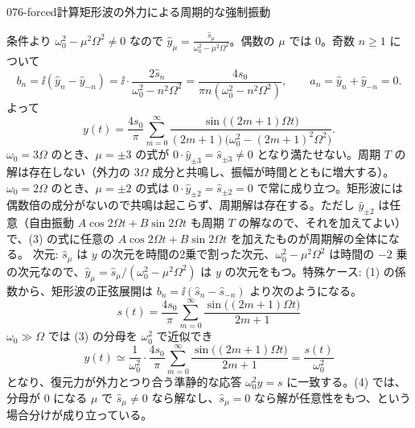 \documentclass[uplatex,dvipdfmx,a4paper,11pt]{jsarticle}
\begin{document}
\begin{mondai}{076-forced}{計算}{矩形波の外力による周期的な強制振動}
\begin{tadashii}
\[\]
 条件より $\omega_0^{2}-\mu^{2}\Omega^{2}\neq0$ なので $\hat{y}_{\mu}=\frac{\hat{s}_{\mu}}{\omega_0^{2}-\mu^{2}\Omega^{2}}$。偶数の $\mu$ では $0$。奇数 $n\ge1$ について
\[
b_n=\ii(\hat{y}_n-\hat{y}_{-n})=\ii\cdot\frac{2\hat{s}_n}{\omega_0^{2}-n^{2}\Omega^{2}}=\frac{4s_0}{\pi n(\omega_0^{2}-n^{2}\Omega^{2})},\qquad a_n=\hat{y}_n+\hat{y}_{-n}=0.
\]
よって
\[
y(t)=\frac{4s_0}{\pi}\sum_{m=0}^{\infty}\frac{\sin\bigl((2m+1)\Omega t\bigr)}{(2m+1)\bigl(\omega_0^{2}-(2m+1)^{2}\Omega^{2}\bigr)}.
\]
 $\omega_0=3\Omega$ のとき、$\mu=\pm3$ の式が $0\cdot\hat{y}_{\pm3}=\hat{s}_{\pm3}\neq0$ となり満たせない。周期 $T$ の解は存在しない（外力の $3\Omega$ 成分と共鳴し、振幅が時間とともに増大する）。
$\omega_0=2\Omega$ のとき、$\mu=\pm2$ の式は $0\cdot\hat{y}_{\pm2}=\hat{s}_{\pm2}=0$ で常に成り立つ。矩形波には偶数倍の成分がないので共鳴は起こらず、周期解は存在する。ただし $\hat{y}_{\pm2}$ は任意（自由振動 $A\cos2\Omega t+B\sin2\Omega t$ も周期 $T$ の解なので、それを加えてよい）で、(3) の式に任意の $A\cos2\Omega t+B\sin2\Omega t$ を加えたものが周期解の全体になる。
\kenzan 次元: $\hat{s}_{\mu}$ は $y$ の次元を時間の2乗で割った次元、$\omega_0^{2}-\mu^{2}\Omega^{2}$ は時間の $-2$ 乗の次元なので、$\hat{y}_{\mu}=\hat{s}_{\mu}/(\omega_0^{2}-\mu^{2}\Omega^{2})$ は $y$ の次元をもつ。特殊ケース: (1) の係数から、矩形波の正弦展開は $b_n=\ii(\hat{s}_n-\hat{s}_{-n})$ より次のようになる。
\[
s(t)=\frac{4s_0}{\pi}\sum_{m=0}^{\infty}\frac{\sin\bigl((2m+1)\Omega t\bigr)}{2m+1}
\]
$\omega_0\gg\Omega$ では (3) の分母を $\omega_0^{2}$ で近似でき
\[
y(t)\simeq\frac{1}{\omega_0^{2}}\cdot\frac{4s_0}{\pi}\sum_{m=0}^{\infty}\frac{\sin\bigl((2m+1)\Omega t\bigr)}{2m+1}=\frac{s(t)}{\omega_0^{2}}
\]
となり、復元力が外力とつり合う準静的な応答 $\omega_0^{2}y=s$ に一致する。(4) では、分母が $0$ になる $\mu$ で $\hat{s}_{\mu}\neq0$ なら解なし、$\hat{s}_{\mu}=0$ なら解が任意性をもつ、という場合分けが成り立っている。
\end{tadashii}
\end{mondai}

\noteowari
\end{document}
